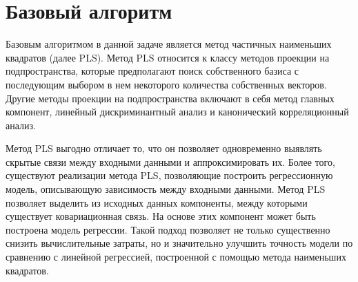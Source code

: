 \section{Базовый алгоритм}
Базовым алгоритмом в данной задаче является метод частичных наименьших квадратов (далее PLS).
Метод PLS относится к классу методов проекции на подпространства, которые предполагают поиск собственного базиса с последующим выбором в нем некоторого количества собственных векторов. Другие методы проекции на подпространства включают в себя метод главных компонент, линейный дискриминантный анализ и канонический корреляционный анализ. 

Метод PLS выгодно отличает то, что он позволяет одновременно выявлять скрытые связи между входными данными и аппроксимировать их. Более того, существуют реализации метода PLS, позволяющие построить регрессионную модель, описывающую зависимость между входными данными. 
Метод  PLS позволяет выделить из исходных данных компоненты, между которыми существует ковариационная связь. На основе этих компонент может быть построена модель регрессии. Такой подход позволяет не только существенно снизить вычислительные затраты, но и значительно улучшить точность модели по сравнению с линейной регрессией, построенной с помощью метода наименьших квадратов. 

